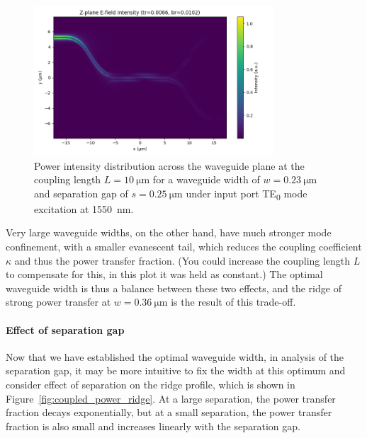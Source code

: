 \documentclass[10pt, a4paper]{article}
\begin{document}
\begin{figure}[h!]
  \centering
  \includegraphics[width=0.8\textwidth]{task3/sim_0524_120625/z_plane_intensity.png}
  \caption{Power intensity distribution across the waveguide plane at the coupling length \(L=\SI{10}{\um}\) for a waveguide width of \(w=\SI{0.23}{\um}\) and separation gap of \(s=\SI{0.25}{\um}\) under input port TE\textsubscript{0} mode excitation at \SI{1550}{\nm}.}
  \label{fig:high_bend_loss}
\end{figure}

Very large waveguide widths, on the other hand, have much stronger mode confinement,
with a smaller evanescent tail, which reduces the coupling coefficient \(\kappa\) and thus the power transfer fraction.
(You could increase the coupling length \(L\) to compensate for this, in this plot it was held as constant.)
The optimal waveguide width is thus a balance between these two effects,
and the ridge of strong power transfer at \(w=\SI{0.36}{\um}\) is the result of this trade-off.

\paragraph{Effect of separation gap}

Now that we have established the optimal waveguide width,
in analysis of the separation gap, it may be more intuitive to fix the width at this optimum and consider effect of separation on the ridge profile,
which is shown in Figure~\ref{fig:coupled_power_ridge}.
At a large separation, the power transfer fraction decays exponentially,
but at a small separation, the power transfer fraction is also small and increases linearly with the separation gap.
\end{document}
